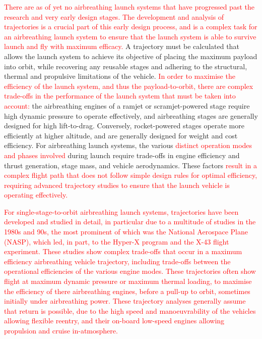   	\textcolor{red}{There are as of yet no airbreathing launch systems that have progressed past the research and very early design stages\cite{Argus,Powell1991,Trefny1999,Roche2000,Pescetelli2012,Young2006,Bradford2000,Hyperion,Wilhite1991,Fujikawa2017,Mehta2001,Takahashi1997,Aberleen,Germain2001,Eklund2012,Bradford2002,Kimura1999,Preller2018a}. The development and analysis of trajectories is a crucial part of this early design process, and is a complex task for an airbreathing launch system to ensure that the launch system is able to survive launch and fly with maximum efficacy.}
  	 A trajectory must be calculated that allows the launch system to achieve its objective of placing the maximum payload into orbit, while recovering any reusable stages and adhering to the structural, thermal and propulsive limitations of the vehicle\cite{Bulirsch1995}.  
  	\textcolor{red}{ In order to maximise the efficiency of the launch system, and thus the payload-to-orbit, there are complex trade-offs in the performance of the launch system that must be taken into account:} the airbreathing engines of a ramjet or scramjet-powered stage require high dynamic pressure to operate effectively, and airbreathing stages are generally designed for high lift-to-drag. Conversely, rocket-powered stages operate more efficiently at higher altitude, and are generally designed for weight and cost efficiency. For airbreathing launch systems, the various \textcolor{red}{distinct operation modes and phases involved} during launch require trade-offs in engine efficiency and thrust generation, stage mass, and vehicle aerodynamics. These factors \textcolor{red}{result in a complex flight path that does not follow simple design rules for optimal efficiency, requiring advanced trajectory studies to ensure that the launch vehicle is operating effectively.}
  	 
  
  	 \textcolor{red}{
  	   For single-stage-to-orbit airbreathing launch systems, trajectories have been developed and studied in detail\cite{Argus,Powell1991,Trefny1999,Roche2000,Pescetelli2012,Young2006,Bradford2000,Hyperion}, in particular due to a multitude of studies in the 1980s and 90s, the most prominent of which was the National Aerospace Plane (NASP), which led, in part, to the Hyper-X program and the X-43 flight experiment\cite{Mcclinton2008}. These studies show complex trade-offs that occur in a maximum efficiency airbreathing vehicle trajectory, including trade-offs between the operational efficiencies of the various engine modes. These trajectories often show flight at maximum dynamic pressure or maximum thermal loading, to maximise the efficiency of there airbreathing engines, before a pull-up to orbit, sometimes initially under airbreathing power. These trajectory analyses generally assume that return is possible, due to the high speed and manoeuvrability of the vehicles allowing flexible reentry, and their on-board low-speed engines allowing propulsion and cruise in-atmosphere. 
  	}
  	
